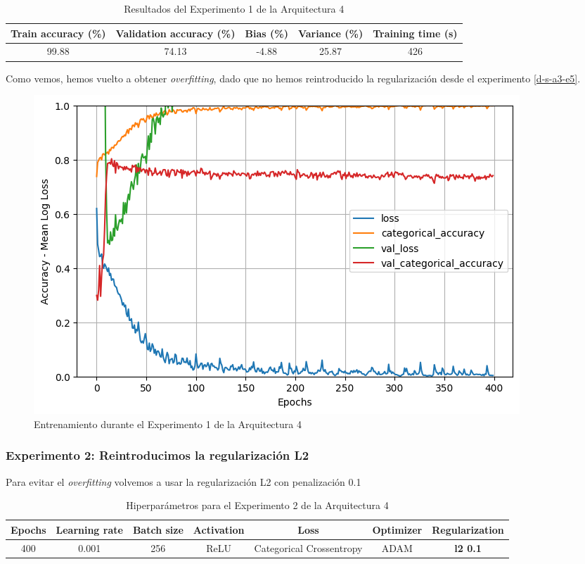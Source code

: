 \documentclass{article}
\begin{document}
			\begin{table}[!h]
				\begin{center}
					\begin{tabular}{| c | c | c | c | c |}
						\textbf{Train accuracy (\%)} & \textbf{Validation accuracy (\%)} & \textbf{Bias (\%)} & \textbf{Variance (\%)} & \textbf{Training time (s)} \\ \hline
						99.88 & 74.13 & -4.88 & 25.87 & 426 \\ \hline
					\end{tabular}
					\caption{Resultados del Experimento 1 de la Arquitectura 4}
					\label{tab:res-d-a4-e	}
				\end{center}
			\end{table}
			
			Como vemos, hemos vuelto a obtener \textit{overfitting}, dado que no hemos reintroducido la regularizaci\'on desde el experimento \ref{d-s-a3-e5}.
			\begin{figure}[!h]
				\begin{center}
					\includegraphics[scale=0.5]{d-tr-a4-e1.png}		
					\caption{Entrenamiento durante el Experimento 1 de la Arquitectura 4}	
					\label{d-tr-a4-e1}
				\end{center}
			\end{figure}
			
		\subsubsection{Experimento 2: Reintroducimos la regularizaci\'on L2}
		\label{d-s-a4-e2}
			Para evitar el \textit{overfitting} volvemos a usar la regularizaci\'on L2 con penalizaci\'on 0.1
			\begin{table}[!h]
				\begin{tabular}{| c | c | c | c | c | c | c |}
					\textbf{Epochs} & \textbf{Learning rate} & \textbf{Batch size} & \textbf{Activation} & \textbf{Loss} & \textbf{Optimizer} & \textbf{Regularization} \\ \hline
					400 & 0.001 & 256 & ReLU & Categorical Crossentropy & ADAM & \textbf{l2 0.1}
				\end{tabular}
				\caption{Hiperpar\'ametros para el Experimento 2 de la Arquitectura 4}
				\label{tab:hip-d-a4-e2}
			\end{table}
\end{document}
